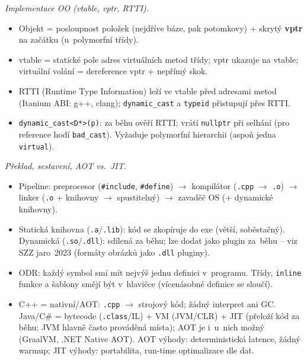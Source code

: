 \documentclass[11pt,a4paper]{article}
\newcommand{\cd}{\lstinline[style=cpp]}
\begin{document}
\begin{poznamka}
\smallskip
\emph{Implementace OO (vtable, vptr, RTTI).}
\begin{itemize}
  \item Objekt = posloupnost položek (nejdříve báze, pak potomkovy) + skrytý \textbf{vptr} na začátku (u~polymorfní třídy).
  \item vtable = statické pole adres virtuálních metod třídy; vptr ukazuje na vtable; virtuální volání = dereference vptr + nepřímý skok.
  \item RTTI (Runtime Type Information) leží ve vtable před adresami metod (Itanium ABI: g++, clang); \cd{dynamic_cast} a \cd{typeid} přistupují přes RTTI.
  \item \cd{dynamic_cast<D*>(p)}: za běhu ověří RTTI; vrátí \cd{nullptr} při selhání (pro reference hodí \cd{bad_cast}). Vyžaduje polymorfní hierarchii (aspoň jedna \cd{virtual}).
\end{itemize}

\smallskip
\emph{Překlad, sestavení, AOT vs.\ JIT.}
\begin{itemize}
  \item Pipeline: preprocesor (\texttt{\#include}, \texttt{\#define}) $\to$ kompilátor (\texttt{.cpp} $\to$ \texttt{.o}) $\to$ linker (\texttt{.o} + knihovny $\to$ spustitelný) $\to$ zavaděč OS (+ dynamické knihovny).
  \item Statická knihovna (\texttt{.a}/\texttt{.lib}): kód se zkopíruje do exe (větší, soběstačný). Dynamická (\texttt{.so}/\texttt{.dll}): sdílená za běhu; lze dodat jako plugin za~běhu -- viz SZZ jaro~2023 (formáty obrázků jako \texttt{.dll} pluginy).
  \item ODR: každý symbol smí mít nejvýš jednu definici v~programu. Třídy, \cd{inline} funkce a šablony smějí být v~hlavičce (vícenásobné definice se sloučí).
  \item C++ = nativní/AOT: \texttt{.cpp} $\to$ strojový kód; žádný interpret ani GC. Java/C\# = bytecode (\texttt{.class}/IL) + VM (JVM/CLR) + JIT (přeloží kód za běhu; JVM hlavně často prováděná místa); AOT je i~u~nich možný (GraalVM, .NET Native AOT). AOT výhody: deterministická latence, žádný warmup; JIT výhody: portabilita, run-time optimalizace dle dat.
\end{itemize}


\end{poznamka}
\end{document}
